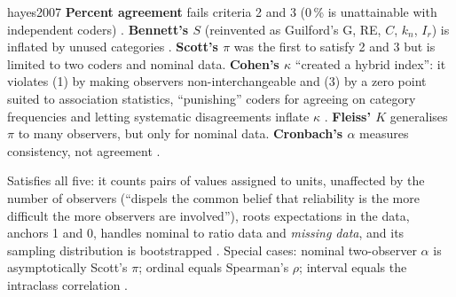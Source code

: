 \begin{papercard}{hayes2007}
 \textbf{Percent agreement} fails criteria 2 and 3 (0\,\% is unattainable with independent coders) . \textbf{Bennett's $S$} (reinvented as Guilford's G, RE, $C$, $k_n$, $I_r$) is inflated by unused categories . \textbf{Scott's $\pi$} was the first to satisfy 2 and 3 but is limited to two coders and nominal data. \textbf{Cohen's $\kappa$} ``created a hybrid index'': it violates (1) by making observers non-interchangeable and (3) by a zero point suited to association statistics, ``punishing'' coders for agreeing on category frequencies and letting systematic disagreements inflate $\kappa$ . \textbf{Fleiss' $K$} generalises $\pi$ to many observers, but only for nominal data. \textbf{Cronbach's $\alpha$} measures consistency, not agreement .

 Satisfies all five: it counts pairs of values assigned to units, unaffected by the number of observers (``dispels the common belief that reliability is the more difficult the more observers are involved''), roots expectations in the data, anchors 1 and 0, handles nominal to ratio data and \emph{missing data}, and its sampling distribution is bootstrapped . Special cases: nominal two-observer $\alpha$ is asymptotically Scott's $\pi$; ordinal equals Spearman's $\rho$; interval equals the intraclass correlation .


\end{papercard}
